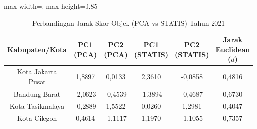 \begin{table}[H]
\centering
\caption{Perbandingan Jarak Skor Objek (PCA vs STATIS) Tahun 2021} \label{tab:sample1jarak_skor_2021}
\begin{adjustbox}{max width=\textwidth, max height=0.85\textheight}
\begin{tabular}{|c|c|c|c|c|c|}
\hline
\textbf{Kabupaten/Kota} & \textbf{PC1 (PCA)} & \textbf{PC2 (PCA)} & \textbf{PC1 (STATIS)} & \textbf{PC2 (STATIS)} & \textbf{Jarak Euclidean ($d$)} \\
\hline
Kota Jakarta Pusat & 1,8897 & 0,0133 & 2,3610 & -0,0858 & 0,4816 \\
Bandung Barat & -2,0623 & -0,4539 & -1,3894 & -0,4687 & 0,6730 \\
Kota Tasikmalaya & -0,2889 & 1,5522 & 0,0260 & 1,2981 & 0,4047 \\
Kota Cilegon & 0,4614 & -1,1117 & 1,1970 & -1,1055 & 0,7357 \\
\hline
\end{tabular}
\end{adjustbox}
\end{table}